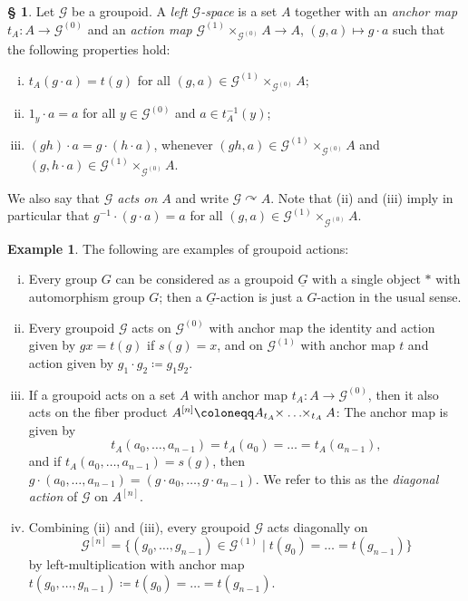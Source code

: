 \documentclass[11pt, oneside]{amsart}
\theoremstyle{definition}
\newtheorem{example}[lemma]{Example}
\newtheorem{no}[lemma]{\S}
\theoremstyle{remark}
\theoremstyle{TheoremNum}
\newcommand{\cG}{\mathcal{G}}
\begin{document}
\begin{no} Let $\cG$ be a groupoid. A \emph{left $\mathcal{G}$-space} is a set $A$ together with an \emph{anchor map} $t_A:A\to \cG^{(0)}$ and an \emph{action map} $\cG^{(1)} \times_{\mathcal{G}^{(0)}} A \to A$, $(g,a) \mapsto g\cdot a$ such that the following properties hold:
\begin{enumerate}[(i)]
\item $t_A(g\cdot a)=t(g)$ for all  $(g,a) \in \mathcal{G}^{(1)}\times_{\mathcal{G}^{(0)}} A$;
\item $1_y\cdot a = a$ for all $y \in \cG^{(0)}$ and $a \in t_A^{-1}(y)$;
\item  $(gh)\cdot a=g\cdot (h\cdot a)$, whenever $(gh,a)\in \mathcal{G}^{(1)}\times_{\mathcal{G}^{(0)}}A$ and $(g,h\cdot a) \in \mathcal{G}^{(1)} \times_{\mathcal{G}^{(0)}} A $.
\end{enumerate}
We also say that \emph{$\mathcal{G}$ acts on $A$} and write $\mathcal{G}\curvearrowright A$. Note that (ii) and (iii) imply in particular that $g^{-1}\cdot (g\cdot a) = a$ for all $(g,a) \in  \mathcal{G}^{(1)}\times_{\mathcal{G}^{(0)}} A$.
\end{no}
\begin{example}\label{ActionExamples} The following are examples of groupoid actions:
\begin{enumerate}[(i)]
\item Every group $G$ can be considered as a groupoid $\underline{G}$ with a single object $*$ with automorphism group $G$; then a $\underline{G}$-action is just a $G$-action in the usual sense.
\item  Every groupoid $\cG$ acts on $\cG^{(0)}$ with anchor map the identity and action given by $g x = t(g)$ if $s(g) = x$, and on 
$\cG^{(1)}$ with anchor map $t$ and action given by $g_1 \cdot g_2 \coloneqq  g_1 g_2$.
\item If a groupoid acts on a set $A$ with anchor map $t_A: A \to \cG^{(0)}$, then it also acts on the fiber product $A^{[n]}\coloneqq A {}_{t_A}\negthickspace\times \ldots\negthickspace \times_{t_A} A$: The anchor map is given by 
\[
t_A(a_0, \dots, a_{n-1}) = t_A(a_0)  = \dots = t_A(a_{n-1}),
\]
and if $t_A(a_0, \dots, a_{n-1})=  s(g)$, then
 $g\cdot (a_0, \dots, a_{n-1}) = (g\cdot a_0, \dots, g\cdot a_{n-1})$. We refer to this as the \emph{diagonal action} of $\cG$ on $A^{[n]}$. 
 \item Combining (ii) and (iii), every groupoid $\cG$ acts diagonally on \[\cG^{[n]} =  \{(g_0, \dots, g_{n-1}) \in \cG^{(1)} \mid t(g_0) = \dots = t(g_{n-1})\}\] by left-multiplication with anchor map $t(g_0,\dots, g_{n-1})\coloneqq t(g_0) = \dots = t(g_{n-1})$.
\end{enumerate}
\end{example}
\end{document}
